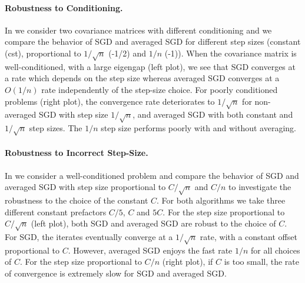  \paragraph{Robustness to Conditioning.} \vspace{-6pt}
 In  we consider two covariance matrices with different conditioning and we compare the behavior of SGD and averaged SGD for different step sizes (constant (cst), proportional to $1/\sqrt{n}$ (-1/2) and  $1/n$ (-1)). When the covariance matrix is well-conditioned, with a large eigengap (left plot), we see that SGD converges at a rate which depends on the step size whereas averaged SGD converges at a $O(1/n)$ rate independently of the step-size choice.  For poorly conditioned problems (right plot), the convergence rate deteriorates to $1/\sqrt{n}$ for non-averaged SGD with step size $1/\sqrt{n}$, and averaged SGD with both constant and $1/\sqrt{n}$ step sizes. The $1/n$ step size performs poorly with and without averaging.
 \vspace{-6pt}
\paragraph{Robustness to Incorrect Step-Size.} In  we consider a well-conditioned problem and compare the behavior of SGD and averaged SGD with step size proportional to $C/\sqrt n$ and $C/n$ to investigate the robustness to the choice of the constant $C$. For both algorithms we take three different constant prefactors $C/5$, $C$ and $5C$. For the step size proportional to $C/\sqrt n$ (left plot), both SGD and averaged SGD are robust to the choice of $C$. For SGD, the iterates eventually converge at a  $1/\sqrt{n}$ rate, with a constant offset proportional to $C$. However, averaged SGD enjoys the fast rate $1/n$ for all choices of $C$. For the step size proportional to $C/n$ (right plot), if $C$ is too small, the rate of convergence is extremely slow for SGD and averaged SGD.

